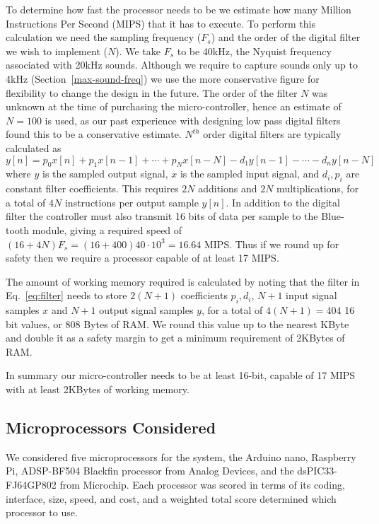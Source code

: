 To determine how fast the processor needs to be we estimate how many Million Instructions Per Second (MIPS) that it has to execute. To perform this calculation we need the sampling frequency ($F_s$) and the order of the digital filter we wish to implement ($N$). We take $F_s$ to be 40kHz, the Nyquist frequency associated with 20kHz sounds. Although we require to capture sounds only up to 4kHz (Section~\ref{max-sound-freq}) we use the more conservative figure for flexibility to change the design in the future. The order of the filter $N$ was unknown at the time of purchasing the micro-controller, hence an estimate of $N=100$ is used, as our past experience with designing low pass digital filters found this to be a conservative estimate. $N^{th}$ order digital filters are typically calculated as~\cite[p.~164]{Mitra2011}
\begin{equation}
y[n] = p_0 x[n] + p_1 x[n-1] + \cdots + p_N x[n-N] - d_1 y[n-1] - \cdots - d_n y[n-N]
\label{eq:filter}
\end{equation}
where $y$ is the sampled output signal, $x$ is the sampled input signal, and $d_i, p_i$ are constant filter coefficients. This requires $2N$ additions and $2N$ multiplications, for a total of $4N$ instructions per output sample $y[n]$. In addition to the digital filter the controller must also transmit 16 bits of data per sample to the Blue-tooth module, giving a required speed of $(16+4N)F_s=(16+400)40\cdot10^3=16.64$ MIPS. Thus if we round up for safety then we require a processor capable of at least 17 MIPS.

The amount of working memory required is calculated by noting that the filter in Eq.~\ref{eq:filter} needs to store $2(N+1)$ coefficients $p_i, d_i$, $N+1$ input signal samples $x$ and $N+1$ output signal samples $y$, for a total of $4(N+1)=404$ 16 bit values, or 808 Bytes of RAM. We round this value up to the nearest KByte and double it as a safety margin to get a minimum requirement of 2KBytes of RAM.

In summary our micro-controller needs to be at least 16-bit, capable of 17 MIPS with at least 2KBytes of working memory.

\subsection{Microprocessors Considered}
We considered five microprocessors for the system, the Arduino nano, Raspberry Pi, ADSP-BF504 Blackfin processor from Analog Devices, and the dsPIC33-FJ64GP802 from Microchip. Each processor was scored in terms of its coding, interface, size, speed, and cost, and a weighted total score determined which processor to use. 

